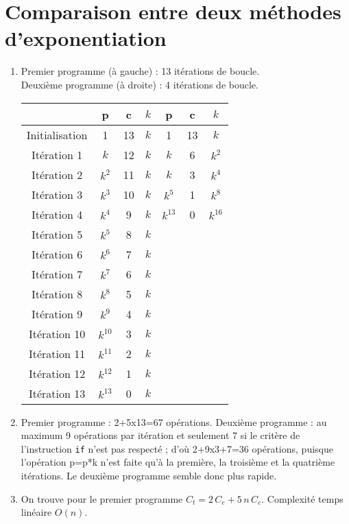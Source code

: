 
\section{Comparaison entre deux méthodes d'exponentiation}

\begin{enumerate}

\item Premier programme (à gauche) : 13 itérations de boucle.\\
Deuxième programme (à droite) : 4 itérations de boucle.
\begin{center}
\begin{tabular}{|c|c|c|c||c|c|c|}\hline
               & p        & c  & $k$ &  p        & c  & $k$\\\hline
Initialisation & 1        & 13 & $k$ &  1        & 13 & $k$ \\\hline
Itération 1    & $k$      & 12 & $k$ & $k$       &  6 & $k^2$\\\hline
Itération 2    & $k^2$    & 11 & $k$ & $k$       &  3 & $k^4$\\\hline
Itération 3    & $k^3$    & 10 & $k$ & $k^5$     &  1 & $k^8$\\\hline
Itération 4    & $k^4$    & 9  & $k$ & $k^{13}$  &  0 & $k^{16}$\\\hline
Itération 5    & $k^5$    & 8  & $k$ &&& \\\hline
Itération 6    & $k^6$    & 7  & $k$ &&& \\\hline
Itération 7    & $k^7$    & 6  & $k$ &&& \\\hline
Itération 8    & $k^8$    & 5  & $k$ &&& \\\hline
Itération 9    & $k^9$    & 4  & $k$ &&& \\\hline
Itération 10   & $k^{10}$ & 3  & $k$ &&& \\\hline
Itération 11   & $k^{11}$ & 2  & $k$ &&& \\\hline
Itération 12   & $k^{12}$ & 1  & $k$ &&& \\\hline
Itération 13   & $k^{13}$ & 0  & $k$ &&&\\\hline
\end{tabular}
\end{center}

\item Premier programme : 2+5x13=67 opérations. Deuxième programme : au maximum 9 opérations par itération et seulement 7 si le critère de l'instruction \texttt{if} n'est pas respecté ; d'où 2+9x3+7=36 opérations, puisque l'opération p=p*k n'est faite qu'à la première, la troisième et la quatrième itérations. Le deuxième programme semble donc plus rapide.

\item On trouve pour le premier programme $C_t= 2\,C_e +5\,n\,C_e$. Complexité temps linéaire $O(n)$.

\end{enumerate}
\newpage
